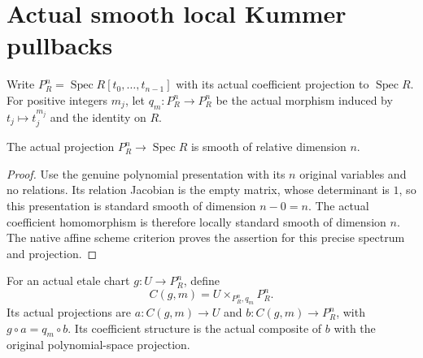 \section{Actual smooth local Kummer pullbacks}

Write $P_R^n=\operatorname{Spec}R[t_0,\ldots,t_{n-1}]$ with its
actual coefficient projection to $\operatorname{Spec}R$.
For positive integers $m_j$, let $q_m:P_R^n\to P_R^n$ be the actual
morphism induced by $t_j\mapsto t_j^{m_j}$ and the identity on $R$.

\begin{lemma}
\label{lem:kn-nadel-kummer-polynomial-smooth}
\leanok
{}
The actual projection $P_R^n\to\operatorname{Spec}R$ is smooth of
relative dimension $n$.
\end{lemma}
\begin{proof}
Use the genuine polynomial presentation with its $n$ original variables
and no relations.  Its relation Jacobian is the empty matrix, whose
determinant is $1$, so this presentation is standard smooth of
dimension $n-0=n$.  The actual coefficient homomorphism is therefore
locally standard smooth of dimension $n$.  The native affine scheme
criterion proves the assertion for this precise spectrum and projection.
\end{proof}

\begin{definition}
\label{def:kn-nadel-kummer-local-pullback}
\leanok
{}
For an actual etale chart $g:U\to P_R^n$, define
\[
 C(g,m)=U\times_{P_R^n,q_m}P_R^n.
\]
Its actual projections are $a:C(g,m)\to U$ and
$b:C(g,m)\to P_R^n$, with $g\circ a=q_m\circ b$.
Its coefficient structure is the actual composite of $b$ with the
original polynomial-space projection.
\end{definition}

